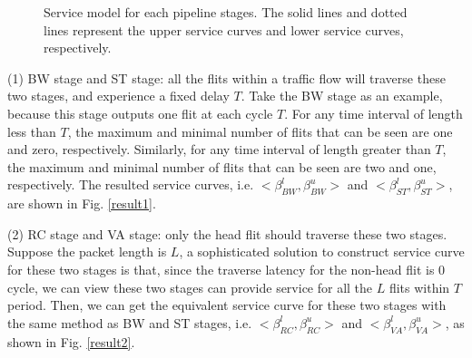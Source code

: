 \documentclass[10pt,journal]{IEEEtran}
\begin{document}
\begin{figure}
  \caption{Service model for each pipeline stages. The solid lines and dotted lines represent the upper service curves and lower service curves, respectively.}
\end{figure}

(1) BW stage and ST stage: all the flits within a traffic flow will traverse these two stages, and experience a fixed delay $T$. Take the BW stage as an example, because this stage outputs one flit at each cycle $T$. For any time interval of length less than $T$, the maximum and minimal number of flits that can be seen are one and zero, respectively. Similarly, for any time interval of length greater than $T$, the maximum and minimal number of flits that can be seen are two and one, respectively. The resulted service curves, i.e. $<\beta^l_{BW},\beta^u_{BW}>$ and $<\beta^l_{ST},\beta^u_{ST}>$, are shown in Fig. \ref{result1}.

(2) RC stage and VA stage: only the head flit should traverse these two stages. Suppose the packet length is $L$, a sophisticated solution to construct service curve for these two stages is that, since the traverse latency for the non-head flit is $0$ cycle, we can view these two stages can provide service for all the $L$ flits within $T$ period. Then, we can get the equivalent service curve for these two stages with the same method as BW and ST stages, i.e. $<\beta^l_{RC},\beta^u_{RC}>$ and $<\beta^l_{VA},\beta^u_{VA}>$, as shown in Fig. \ref{result2}.
\end{document}
